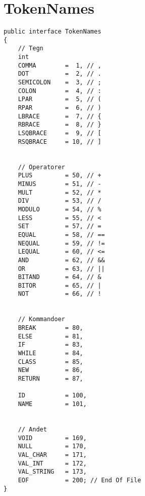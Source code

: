 \chapter{TokenNames}
\label{a:tokennames}
\OverviewLineNoTitle
\begin{footnotesize}\begin{verbatim}
public interface TokenNames
{
    // Tegn
    int
    COMMA        =  1, // ,
    DOT          =  2, // .
    SEMICOLON    =  3, // ;
    COLON        =  4, // :
    LPAR         =  5, // (
    RPAR         =  6, // )
    LBRACE       =  7, // {
    RBRACE       =  8, // }
    LSQBRACE     =  9, // [
    RSQBRACE     = 10, // ]


    // Operatorer
    PLUS         = 50, // +
    MINUS        = 51, // -
    MULT         = 52, // *
    DIV          = 53, // /
    MODULO       = 54, // %
    LESS         = 55, // <
    SET          = 57, // =
    EQUAL        = 58, // ==
    NEQUAL       = 59, // !=
    LEQUAL       = 60, // <=
    AND          = 62, // &&
    OR           = 63, // ||
    BITAND       = 64, // &
    BITOR        = 65, // |
    NOT          = 66, // !


    // Kommandoer
    BREAK        = 80,
    ELSE         = 81,
    IF           = 83,
    WHILE        = 84,
    CLASS        = 85,
    NEW          = 86,
    RETURN       = 87,

    ID           = 100,
    NAME         = 101,


    // Andet
    VOID         = 169,
    NULL         = 170,
    VAL_CHAR     = 171,
    VAL_INT      = 172,
    VAL_STRING   = 173,
    EOF          = 200; // End Of File
}
\end{verbatim}\end{footnotesize}






                                         